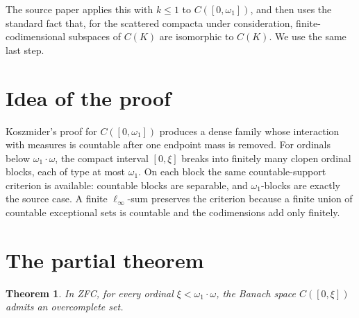 \documentclass[11pt]{article}
\newtheorem{theorem}{Theorem}
\begin{document}
The source paper applies this with \(k\leq 1\) to \(C([0,\omega_1])\), and then
uses the standard fact that, for the scattered compacta under consideration,
finite-codimensional subspaces of \(C(K)\) are isomorphic to \(C(K)\). We use
the same last step.

\section{Idea of the proof}

Koszmider's proof for \(C([0,\omega_1])\) produces a dense family whose
interaction with measures is countable after one endpoint mass is removed.
For ordinals below \(\omega_1\cdot\omega\), the compact interval \([0,\xi]\)
breaks into finitely many clopen ordinal blocks, each of type at most
\(\omega_1\). On each block the same countable-support criterion is available:
countable blocks are separable, and \(\omega_1\)-blocks are exactly the source
case. A finite \(\ell_\infty\)-sum preserves the criterion because a finite
union of countable exceptional sets is countable and the codimensions add only
finitely.

\section{The partial theorem}

\begin{theorem}\label{thm:main}
In ZFC, for every ordinal \(\xi<\omega_1\cdot\omega\), the Banach space
\(C([0,\xi])\) admits an overcomplete set.
\end{theorem}
\end{document}
